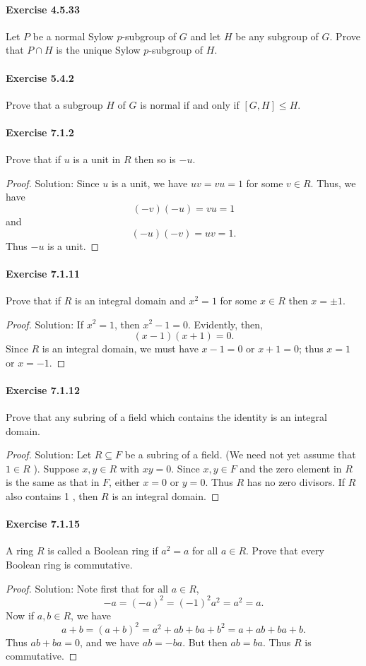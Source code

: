 \documentclass{article}
\theoremstyle{definition}
\begin{document}
\paragraph{Exercise 4.5.33} Let $P$ be a normal Sylow $p$-subgroup of $G$ and let $H$ be any subgroup of $G$. Prove that $P \cap H$ is the unique Sylow $p$-subgroup of $H$.

\paragraph{Exercise 5.4.2} Prove that a subgroup $H$ of $G$ is normal if and only if $[G, H] \leq H$.

\paragraph{Exercise 7.1.2} Prove that if $u$ is a unit in $R$ then so is $-u$.
\begin{proof}
    Solution: Since $u$ is a unit, we have $u v=v u=1$ for some $v \in R$. Thus, we have
$$
(-v)(-u)=v u=1
$$
and
$$
(-u)(-v)=u v=1 .
$$
Thus $-u$ is a unit.
\end{proof}


\paragraph{Exercise 7.1.11} Prove that if $R$ is an integral domain and $x^{2}=1$ for some $x \in R$ then $x=\pm 1$.
\begin{proof}
    Solution: If $x^2=1$, then $x^2-1=0$. Evidently, then,
$$
(x-1)(x+1)=0 .
$$
Since $R$ is an integral domain, we must have $x-1=0$ or $x+1=0$; thus $x=1$ or $x=-1$.
\end{proof}


\paragraph{Exercise 7.1.12} Prove that any subring of a field which contains the identity is an integral domain.
\begin{proof}
    Solution: Let $R \subseteq F$ be a subring of a field. (We need not yet assume that $1 \in R$ ). Suppose $x, y \in R$ with $x y=0$. Since $x, y \in F$ and the zero element in $R$ is the same as that in $F$, either $x=0$ or $y=0$. Thus $R$ has no zero divisors. If $R$ also contains 1 , then $R$ is an integral domain.
\end{proof}


\paragraph{Exercise 7.1.15} A ring $R$ is called a Boolean ring if $a^{2}=a$ for all $a \in R$. Prove that every Boolean ring is commutative.
\begin{proof}
    Solution: Note first that for all $a \in R$,
$$
-a=(-a)^2=(-1)^2 a^2=a^2=a .
$$
Now if $a, b \in R$, we have
$$
a+b=(a+b)^2=a^2+a b+b a+b^2=a+a b+b a+b .
$$
Thus $a b+b a=0$, and we have $a b=-b a$. But then $a b=b a$. Thus $R$ is commutative.
\end{proof}
\end{document}
